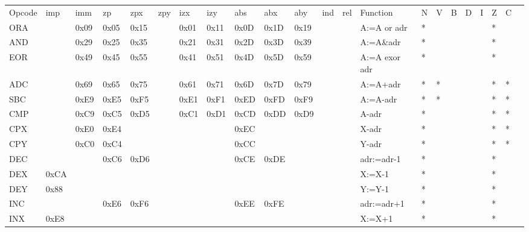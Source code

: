\documentclass[a4paper]{article}
\begin{document}
 
\setlength\parskip{0.5cm}

\begin{sidewaystable}
\end{sidewaystable}


\begin{sidewaystable}
  \centering
  \begin{tabular}{llllllllllllllllllllll}
Opcode & imp & imm & zp & zpx  & zpy & izx & izy & abs & abx  & aby & ind & rel & Function  & N & V & B & D & I & Z & C & \\
ORA &   & 0x09 & 0x05 & 0x15  &   & 0x01 & 0x11 & 0x0D & 0x1D  & 0x19 &   &   & A:=A or {adr}  & * &   &   &   &   & * &   & \\
AND &   & 0x29 & 0x25 & 0x35  &   & 0x21 & 0x31 & 0x2D & 0x3D  & 0x39 &   &   & A:=A\&{adr}  & * &   &   &   &   & * &   & \\
EOR &   & 0x49 & 0x45 & 0x55  &   & 0x41 & 0x51 & 0x4D & 0x5D  & 0x59 &   &   & A:=A exor {adr}  & * &   &   &   &   & * &   & \\
ADC &   & 0x69 & 0x65 & 0x75  &   & 0x61 & 0x71 & 0x6D & 0x7D  & 0x79 &   &   & A:=A+{adr}  & * & * &   &   &   & * & * & \\
SBC &   & 0xE9 & 0xE5 & 0xF5  &   & 0xE1 & 0xF1 & 0xED & 0xFD  & 0xF9 &   &   & A:=A-{adr}  & * & * &   &   &   & * & * & \\
CMP &   & 0xC9 & 0xC5 & 0xD5  &   & 0xC1 & 0xD1 & 0xCD & 0xDD  & 0xD9 &   &   & A-{adr}  & * &   &   &   &   & * & * & \\
CPX &   & 0xE0 & 0xE4 &    &   &   &   & 0xEC &    &   &   &   & X-{adr}  & * &   &   &   &   & * & * & \\
CPY &   & 0xC0 & 0xC4 &    &   &   &   & 0xCC &    &   &   &   & Y-{adr}  & * &   &   &   &   & * & * & \\
DEC &   &   & 0xC6 & 0xD6  &   &   &   & 0xCE & 0xDE  &   &   &   & {adr}:={adr}-1  & * &   &   &   &   & * &   & \\
DEX & 0xCA &   &   &    &   &   &   &   &    &   &   &   & X:=X-1  & * &   &   &   &   & * &   & \\
DEY & 0x88 &   &   &    &   &   &   &   &    &   &   &   & Y:=Y-1  & * &   &   &   &   & * &   & \\
INC &   &   & 0xE6 & 0xF6  &   &   &   & 0xEE & 0xFE  &   &   &   & {adr}:={adr}+1  & * &   &   &   &   & * &   & \\
INX & 0xE8 &   &   &    &   &   &   &   &    &   &   &   & X:=X+1  & * &   &   &   &   & * &   & \\

\end{tabular}
\end{sidewaystable}
\end{document}
